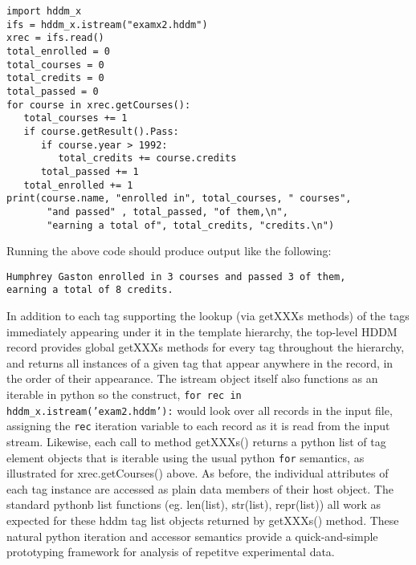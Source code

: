 \documentclass{revtex4}
\begin{document}
\vspace{1cm}
\begin{minipage}{12cm}
\begin{verbatim}
import hddm_x
ifs = hddm_x.istream("examx2.hddm")
xrec = ifs.read()
total_enrolled = 0
total_courses = 0
total_credits = 0
total_passed = 0
for course in xrec.getCourses():
   total_courses += 1
   if course.getResult().Pass:
      if course.year > 1992:
         total_credits += course.credits
      total_passed += 1
   total_enrolled += 1
print(course.name, "enrolled in", total_courses, " courses",
       "and passed" , total_passed, "of them,\n",
       "earning a total of", total_credits, "credits.\n")
\end{verbatim}
\end{minipage}
\vspace{1cm}

Running the above code should produce output like the following:

\vspace{1cm}
\begin{minipage}{12cm}
\begin{verbatim}
Humphrey Gaston enrolled in 3 courses and passed 3 of them,
earning a total of 8 credits.
\end{verbatim}
\end{minipage}
\vspace{1cm}

In addition to each tag supporting the lookup (via getXXXs methods) of the
tags immediately appearing under it in the template hierarchy, the 
top-{}level HDDM record provides global getXXXs methods for every tag
throughout the hierarchy, and returns all instances of a given tag that
appear anywhere in the record, in the order of their appearance. The
istream object itself also functions as an iterable in python so the
construct, \texttt{for rec in hddm\_x.istream('exam2.hddm'):} would
look over all records in the input file, assigning the \texttt{rec}
iteration variable to each record as it is read from the input stream.
Likewise, each call to method getXXXs() returns a python list of tag
element objects that is iterable using the usual python \texttt{for}
semantics, as illustrated for xrec.getCourses() above. As before, the
individual attributes of each tag instance are accessed as plain data 
members of their host object. The standard pythonb list functions (eg.
len(list), str(list), repr(list)) all work as expected for these hddm
tag list objects returned by getXXXs() method. These natural python
iteration and accessor semantics provide a quick-{}and-{}simple
prototyping framework for analysis of repetitve experimental data.
\end{document}
